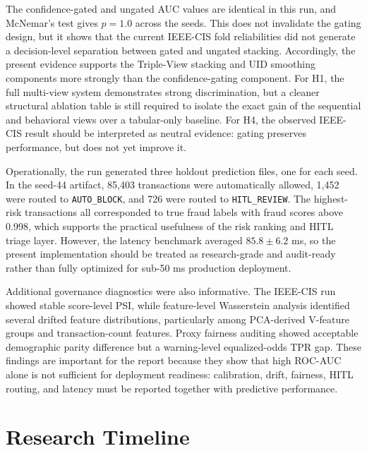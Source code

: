 \documentclass[10pt,a4paper,twocolumn]{article}
\begin{document}
The confidence-gated and ungated AUC values are identical in this run, and McNemar's test gives $p=1.0$ across the seeds. This does not invalidate the gating design, but it shows that the current IEEE-CIS fold reliabilities did not generate a decision-level separation between gated and ungated stacking. Accordingly, the present evidence supports the Triple-View stacking and UID smoothing components more strongly than the confidence-gating component. For H1, the full multi-view system demonstrates strong discrimination, but a cleaner structural ablation table is still required to isolate the exact gain of the sequential and behavioral views over a tabular-only baseline. For H4, the observed IEEE-CIS result should be interpreted as neutral evidence: gating preserves performance, but does not yet improve it.

Operationally, the run generated three holdout prediction files, one for each seed. In the seed-44 artifact, 85{,}403 transactions were automatically allowed, 1{,}452 were routed to \texttt{AUTO\_BLOCK}, and 726 were routed to \texttt{HITL\_REVIEW}. The highest-risk transactions all corresponded to true fraud labels with fraud scores above 0.998, which supports the practical usefulness of the risk ranking and HITL triage layer. However, the latency benchmark averaged $85.8 \pm 6.2$ ms, so the present implementation should be treated as research-grade and audit-ready rather than fully optimized for sub-50 ms production deployment.

Additional governance diagnostics were also informative. The IEEE-CIS run showed stable score-level PSI, while feature-level Wasserstein analysis identified several drifted feature distributions, particularly among PCA-derived V-feature groups and transaction-count features. Proxy fairness auditing showed acceptable demographic parity difference but a warning-level equalized-odds TPR gap. These findings are important for the report because they show that high ROC-AUC alone is not sufficient for deployment readiness: calibration, drift, fairness, HITL routing, and latency must be reported together with predictive performance.

\section{Research Timeline}
\end{document}
